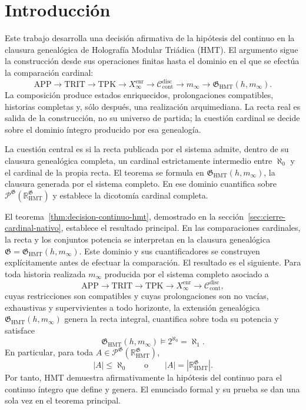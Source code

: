 \section{Introducción}
\label{sec:introduccion-ch}

Este trabajo desarrolla una decisión afirmativa de la hipótesis del continuo
en la clausura genealógica de Holografía Modular Triádica (HMT). El argumento
sigue la construcción desde sus operaciones finitas hasta el dominio en el
que se efectúa la comparación cardinal:
\[
 \mathrm{APP}\longrightarrow\mathrm{TRIT}\longrightarrow\mathrm{TPK}
 \longrightarrow X_\infty^{\mathrm{enr}}
 \longrightarrow\mathcal C_{\mathrm{cont}}^{\mathrm{disc}}
 \longrightarrow m_\infty
 \longrightarrow\mathfrak G_{\mathrm{HMT}}(h,m_\infty).
\]
La composición produce estados enriquecidos, prolongaciones compatibles,
historias completas y, sólo después, una realización arquimediana. La recta
real es salida de la construcción, no su universo de partida; la cuestión
cardinal se decide sobre el dominio íntegro producido por esa genealogía.

La cuestión central es si la recta publicada por el sistema admite, dentro de
su clausura genealógica completa, un cardinal estrictamente intermedio entre
\(\aleph_0\) y el cardinal de la propia recta. El teorema se formula en
\(\mathfrak G_{\mathrm{HMT}}(h,m_\infty)\), la clausura generada por el sistema
completo. En ese dominio cuantifica sobre
\(\mathcal P^{\mathfrak G}(\mathbb R_{\mathrm{HMT}}^{\mathfrak G})\) y
establece la dicotomía cardinal completa.

El teorema~\ref{thm:decision-continuo-hmt}, demostrado en la
sección~\ref{sec:cierre-cardinal-nativo}, establece el resultado principal.
En las comparaciones cardinales, la recta y los conjuntos potencia se
interpretan en la clausura genealógica
\(\mathfrak G=\mathfrak G_{\mathrm{HMT}}(h,m_\infty)\). Este dominio y sus
cuantificadores se construyen explícitamente antes de efectuar la comparación.
El resultado es el siguiente. Para toda historia realizada \(m_\infty\)
producida por el sistema completo asociado a
\[
 \mathrm{APP}\longrightarrow\mathrm{TRIT}\longrightarrow\mathrm{TPK}
 \longrightarrow X_\infty^{\mathrm{enr}}
 \longrightarrow\mathcal C_{\mathrm{cont}}^{\mathrm{disc}},
\]
cuyas restricciones son compatibles y cuyas prolongaciones son no vacías,
exhaustivas y supervivientes a todo horizonte, la extensión genealógica
\(\mathfrak G_{\mathrm{HMT}}(h,m_\infty)\) genera la recta integral,
cuantifica sobre toda su potencia y satisface
\[
 \mathfrak G_{\mathrm{HMT}}(h,m_\infty)
 \models 2^{\aleph_0}=\aleph_1.
\]
En particular, para toda
\(A\in\mathcal P^{\mathfrak G}(\mathbb R_{\mathrm{HMT}}^{\mathfrak G})\),
\[
 |A|\leq\aleph_0
 \qquad\text{o}\qquad
 |A|=|\mathbb R_{\mathrm{HMT}}^{\mathfrak G}|.
\]
Por tanto, HMT demuestra afirmativamente la hipótesis del continuo para el
continuo íntegro que define y genera. El enunciado formal y su prueba se dan
una sola vez en el teorema principal.

